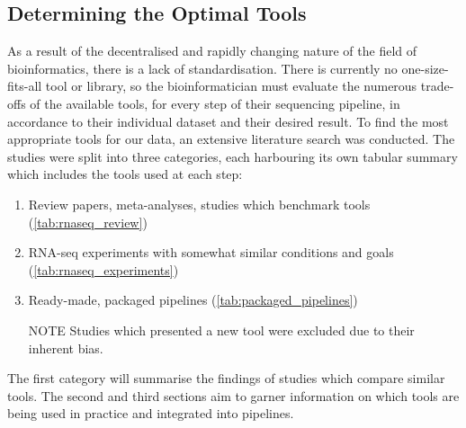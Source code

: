 
\subsection{Determining the Optimal Tools}
As a result of the decentralised and rapidly changing nature of the field of bioinformatics, there is a lack of standardisation. There is currently no one-size-fits-all tool or library, so the bioinformatician must evaluate the numerous trade-offs of the available tools, for every step of their sequencing pipeline, in accordance to their individual dataset and their desired result. To find the most appropriate tools for our data, an extensive literature search was conducted. The studies were split into three categories, each harbouring its own tabular summary which includes the tools used at each step:

\begin{enumerate}
\item Review papers, meta-analyses, studies which benchmark tools (\autoref{tab:rnaseq_review})
\item RNA-seq experiments with somewhat similar conditions and goals (\autoref{tab:rnaseq_experiments})
\item Ready-made, packaged pipelines (\autoref{tab:packaged_pipelines})
\item[NOTE] Studies which presented a new tool were excluded due to their inherent bias.
\end{enumerate}

The first category will summarise the findings of studies which compare similar tools. The second and third sections aim to garner information on which tools are being used in practice and integrated into pipelines.

